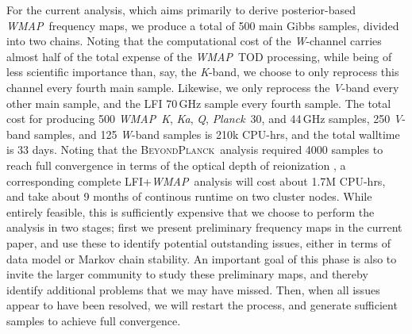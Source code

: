 \documentclass[twocolumn]{../../common/aa}
\def\WMAP{\emph{WMAP}}
\def\Planck{\emph{Planck}}
\newcommand{\bp}{\textsc{BeyondPlanck}}
\newcommand{\K}[0]{\textit K}
\newcommand{\Ka}[0]{\textit{Ka}}
\newcommand{\Q}[0]{\textit Q}
\newcommand{\V}[0]{\textit V}
\newcommand{\W}[0]{\textit W}
\begin{document}
For the current analysis, which aims primarily to derive posterior-based \WMAP\ frequency maps, we produce a total of 500 main Gibbs samples, divided into two chains. Noting that the computational cost of the \W-channel carries almost half of the total expense of the \WMAP\ TOD processing, while being of less scientific importance than, say, the \K-band, we choose to only reprocess this channel every fourth main sample. Likewise, we only reprocess the \V-band every other main sample, and the LFI 70\,GHz sample every fourth sample. The total cost for producing 500 \WMAP\ \K, \Ka, \Q, \Planck\ 30, and 44\,GHz samples, 250 \V-band samples, and 125 \W-band samples is 210k CPU-hrs, and the total walltime is 33 days. Noting that the \bp\ analysis required 4000 samples to reach full convergence in terms of the optical depth of reionization \citep{bp12}, a corresponding complete LFI+\WMAP\ analysis will cost about 1.7M CPU-hrs, and take about 9 months of continous runtime on two cluster nodes. While entirely feasible, this is sufficiently expensive that we choose to perform the analysis in two stages; first we present preliminary frequency maps in the current paper, and use these to identify potential outstanding issues, either in terms of data model or Markov chain stability. An important goal of this phase is also to invite the larger community to study these preliminary maps, and thereby identify additional problems that we may have missed. Then, when all issues appear to have been resolved, we will restart the process, and generate sufficient samples to achieve full convergence.











\end{document}
